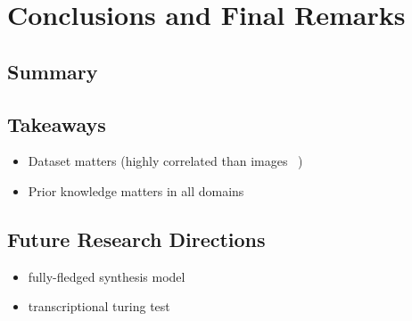 
\graphicspath{{8-conclusions/figures/}}

\chapter{Conclusions and Final Remarks}
\label{ch:conclusions}

\section{Summary}

\section{Takeaways}

\begin{itemize}
	\item Dataset matters (highly correlated than images ~\cite{thickstun2018invariances})
	\item Prior knowledge matters in all domains
\end{itemize}


\section{Future Research Directions}

\begin{itemize}
	\item fully-fledged synthesis model
	\item transcriptional turing test
\end{itemize}
